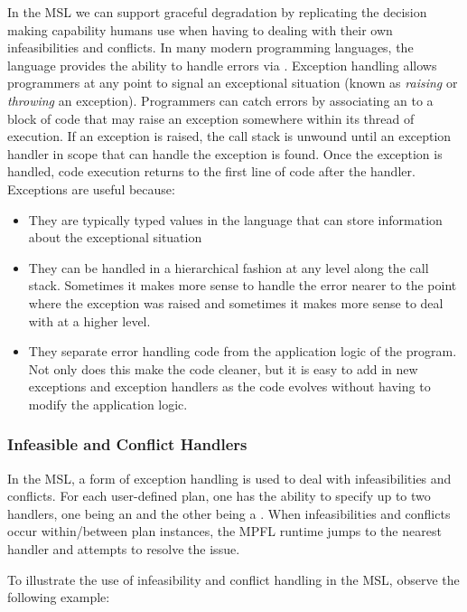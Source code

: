 In the MSL we can support graceful degradation by replicating the decision making capability humans use when having to dealing with their own infeasibilities and conflicts. In many modern programming languages, the language provides the ability to handle errors via . Exception handling allows programmers at any point to signal an exceptional situation (known as \emph{raising} or \emph{throwing} an exception). Programmers can catch errors by associating an  to a block of code that may raise an exception somewhere within its thread of execution. If an exception is raised, the call stack is unwound until an exception handler in scope that can handle the exception is found. Once the exception is handled, code execution returns to the first line of code after the handler. Exceptions are useful because:
\begin{itemize}
\item They are typically typed values in the language that can store information about the exceptional situation
\item They can be handled in a hierarchical fashion at any level along the call stack. Sometimes it makes more sense to handle the error nearer to the point where the exception was raised and sometimes it makes more sense to deal with at a higher level.
\item They separate error handling code from the application logic of the program. Not only does this make the code cleaner, but it is easy to add in new exceptions and exception handlers as the code evolves without having to modify the application logic.
\end{itemize}

\subsubsection{Infeasible and Conflict Handlers}
In the MSL, a form of exception handling is used to deal with infeasibilities and conflicts. For each user-defined plan, one has the ability to specify up to two handlers, one being an  and the other being a . When infeasibilities and conflicts occur within/between plan instances, the MPFL runtime jumps to the nearest handler and attempts to resolve the issue.

To illustrate the use of infeasibility and conflict handling in the MSL, observe the following example:

